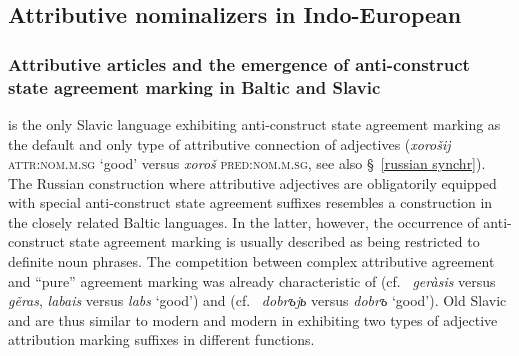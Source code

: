 \subsection{Attributive nominalizers in Indo-European} \label{ie diachr}

\subsubsection[Baltic and Slavic]{Attributive articles and the emergence of anti\hyp{}construct state agreement marking in Baltic and Slavic} \label{slavic diachr}

 is the only Slavic language exhibiting anti\hyp{}construct state agreement marking as the default and only type of attributive connection of adjectives (\textit{xorošij} \textsc{attr:nom.m.sg} ‘good’ versus \textit{xoroš} \textsc{pred:nom.m.sg}, see also \S~\ref{russian synchr}). The Russian construction where attributive adjectives are obligatorily equipped with special anti\hyp{}construct state agreement suffixes resembles a construction in the closely related Baltic languages. In the latter, however, the occurrence of anti\hyp{}construct state agreement marking is usually described as being restricted to definite noun phrases. The competition between complex attributive agreement and “pure” agreement marking was already characteristic of  (cf.~ \textit{geràsis} versus \textit{g{\~e}ras},  \textit{labais} versus \textit{labs} ‘good’) and  (cf.~ \textit{dobrъjь} versus \textit{dobrъ} ‘good’). Old Slavic and  are thus similar to modern  and modern  in exhibiting two types of adjective attribution marking suffixes in different functions.

